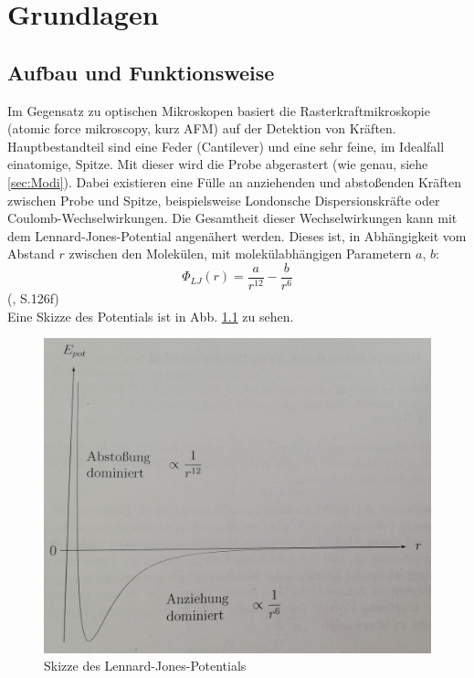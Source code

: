 
\chapter{Grundlagen}
\section{Aufbau und Funktionsweise}
Im Gegensatz zu optischen Mikroskopen basiert die Rasterkraftmikroskopie (atomic force mikroscopy, kurz AFM) auf der Detektion von Kräften. 
Hauptbestandteil sind eine Feder (Cantilever) und eine sehr feine, im Idealfall einatomige, Spitze. Mit dieser wird die Probe abgerastert 
(wie genau, siehe \ref{sec:Modi}). Dabei existieren eine Fülle an anziehenden und abstoßenden Kräften zwischen Probe und Spitze, beispielsweise 
Londonsche Dispersionskräfte oder Coulomb-Wechselwirkungen. Die Gesamtheit dieser Wechselwirkungen kann mit dem Lennard-Jones-Potential 
angenähert werden. Dieses ist, in Abhängigkeit vom Abstand $r$ zwischen den Molekülen, mit molekülabhängigen Parametern $a$, $b$: 
\begin{equation*}
    \Phi_{LJ}(r) = \frac{a}{r^{12}} - \frac{b}{r^6}
\end{equation*}
(\cite{Demtroeder2013}, S.126f) \\
Eine Skizze des Potentials ist in Abb. \ref{bild:LJP} zu sehen.

\begin{figure}[h]
    \centering
    \includegraphics[scale = 0.135]{Bilder/LennardJones.jpg}
    \caption{Skizze des Lennard-Jones-Potentials \protect \footnotemark}
    \label{bild:LJP}
\end{figure}


